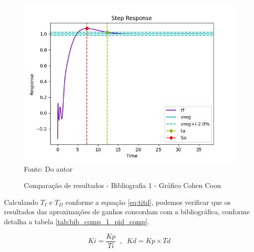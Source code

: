 \begin{figure}[H]
    \centering
    \caption{Comparação de resultados - Bibliografia 1 - Gráfico Cohen Coon}
    \includegraphics[scale=0.8]{figuras/bib_comp_1_code1_out_fig3}
    \label{fig:bib_comp_1_code1_out_fig3}
    \\
    \vspace{0cm}\hspace{0cm}\small{Fonte: Do autor}
\end{figure}

Calculando $T_I$ e $T_D$ conforme a equação \ref{eq:titd}, podemos verificar que os resultados das aproximações de
ganhos concordam com a bibliográfica, conforme detalha a tabela \ref{tab:bib_comp_1_pid_comp}.

\begin{equation}
    \label{eq:titd}
    Ki = \frac{Kp}{Ti} \;\; , \;\; Kd = Kp \times Td
\end{equation}

